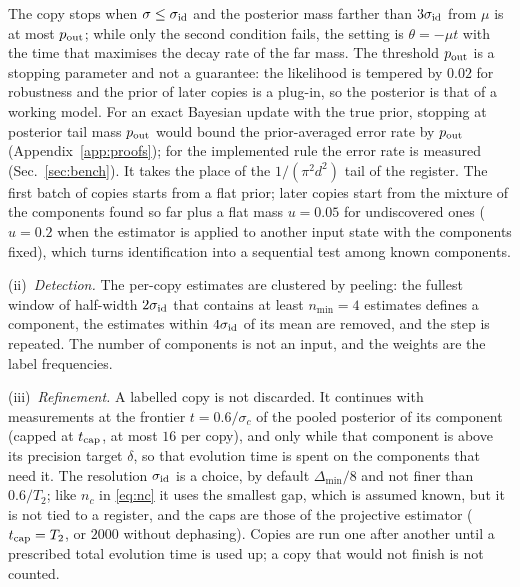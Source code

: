 \documentclass[journal]{IEEEtran}
\begin{document}
The copy stops when $\sigma\le\sigma_{\rm id}$ and the posterior mass farther than $3\sigma_{\rm id}$ from $\mu$ is at most $p_{\rm out}$; while only the second condition fails, the setting is $\theta=-\mu t$ with the time that maximises the decay rate of the far mass. The threshold $p_{\rm out}$ is a stopping parameter and not a guarantee: the likelihood is tempered by $0.02$ for robustness and the prior of later copies is a plug-in, so the posterior is that of a working model. For an exact Bayesian update with the true prior, stopping at posterior tail mass $p_{\rm out}$ would bound the prior-averaged error rate by $p_{\rm out}$ (Appendix~\ref{app:proofs}); for the implemented rule the error rate is measured (Sec.~\ref{sec:bench}). It takes the place of the $1/(\pi^2d^2)$ tail of the register. The first batch of copies starts from a flat prior; later copies start from the mixture of the components found so far plus a flat mass $u=0.05$ for undiscovered ones ($u=0.2$ when the estimator is applied to another input state with the components fixed), which turns identification into a sequential test among known components.

(ii)~\emph{Detection.} The per-copy estimates are clustered by peeling: the fullest window of half-width $2\sigma_{\rm id}$ that contains at least $n_{\min}=4$ estimates defines a component, the estimates within $4\sigma_{\rm id}$ of its mean are removed, and the step is repeated. The number of components is not an input, and the weights are the label frequencies.

(iii)~\emph{Refinement.} A labelled copy is not discarded. It continues with measurements at the frontier $t=0.6/\sigma_c$ of the pooled posterior of its component (capped at $t_{\rm cap}$, at most $16$ per copy), and only while that component is above its precision target $\delta$, so that evolution time is spent on the components that need it. The resolution $\sigma_{\rm id}$ is a choice, by default $\Delta_{\min}/8$ and not finer than $0.6/T_2$; like $n_c$ in \eqref{eq:nc} it uses the smallest gap, which is assumed known, but it is not tied to a register, and the caps are those of the projective estimator ($t_{\rm cap}=T_2$, or $2000$ without dephasing). Copies are run one after another until a prescribed total evolution time is used up; a copy that would not finish is not counted.
\end{document}
